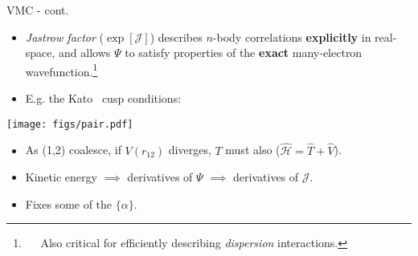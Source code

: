 \documentclass[12pt, pdf, hyperref={draft}, usenames, dvipsnames]{beamer}
\begin{document}
\begin{frame}{VMC - cont.}

\begin{itemize}
  \item {\it Jastrow factor} ($\exp{\left[ \mathcal{J} \right]}$) describes
  $n$-body correlations {\bf explicitly} in real-space, and allows
  $\Psi$ to satisfy properties of the {\bf exact} many-electron
  wavefunction.\footnote{~~ Also critical for efficiently describing {\it
  dispersion} interactions.}

  \item E.g. the Kato~ cusp conditions:

\end{itemize}

\begin{minipage}[t]{0.25\textwidth}
\vspace{0.75cm}
\centering
\hfill\texttt{[image: figs/pair.pdf]}

\end{minipage}%
\hfill
\begin{minipage}[t]{0.65\textwidth}

\begin{itemize}
  \item As (1,2) coalesce, if $V(r_{12})$ diverges,
  $T$ must also ($\mathcal{\hat H}={\hat T}+{\hat V}$).
  \item Kinetic energy $\implies$ derivatives of $\Psi$ $\implies$ derivatives
  of $\mathcal{J}$.
  \item Fixes some of the $\{\alpha\}$.
\end{itemize}

\end{minipage}%

\end{frame}


\end{document}
